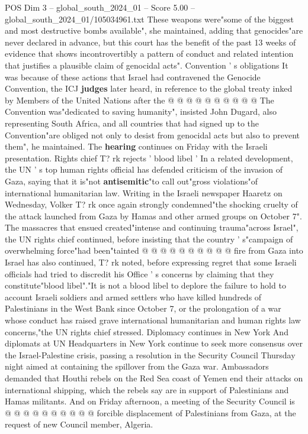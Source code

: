 \begin{textsample}{POS Dim 3 – global\_south\_2024\_01 – Score 5.00 – global\_south\_2024\_01/105034961.txt}
These weapons were"some of the biggest and most destructive bombs available", she maintained, adding that genocides"are never declared in advance, but this court has the benefit of the past 13 weeks of evidence that shows incontrovertibly a pattern of conduct and related intention that justifies a plausible claim of genocidal acts".
Convention ' s obligations It was because of these actions that Israel had contravened the Genocide Convention, the ICJ \textbf{judges} later heard, in reference to the global treaty inked by Members of the United Nations after the @ @ @ @ @ @ @ @ @ @ The Convention was"dedicated to saving humanity", insisted John Dugard, also representing South Africa, and all countries that had signed up to the Convention"are obliged not only to desist from genocidal acts but also to prevent them", he maintained.
The \textbf{hearing} continues on Friday with the Israeli presentation.
Rights chief T? rk rejects ' blood libel ' In a related development, the UN ' s top human rights official has defended criticism of the invasion of Gaza, saying that it is"not \textbf{antisemitic}"to call out"gross violations"of international humanitarian law.
Writing in the Israeli newspaper Haaretz on Wednesday, Volker T? rk once again strongly condemned"the shocking cruelty of the attack launched from Gaza by Hamas and other armed groups on October 7".
The massacres that ensued created"intense and continuing trauma"across Israel", the UN rights chief continued, before insisting that the country ' s"campaign of overwhelming force"had been"tainted @ @ @ @ @ @ @ @ @ @ fire from Gaza into Israel has also continued, T? rk noted, before expressing regret that some Israeli officials had tried to discredit his Office ' s concerns by claiming that they constitute"blood libel"."It is not a blood libel to deplore the failure to hold to account Israeli soldiers and armed settlers who have killed hundreds of Palestinians in the West Bank since October 7, or the prolongation of a war whose conduct has raised grave international humanitarian and human rights law concerns,"the UN rights chief stressed.
Diplomacy continues in New York And diplomats at UN Headquarters in New York continue to seek more consensus over the Israel-Palestine crisis, passing a resolution in the Security Council Thursday night aimed at containing the spillover from the Gaza war.
Ambassadors demanded that Houthi rebels on the Red Sea coast of Yemen end their attacks on international shipping, which the rebels say are in support of Palestinians and Hamas militants.
And on Friday afternoon, a meeting of the Security Council is @ @ @ @ @ @ @ @ @ @ forcible displacement of Palestinians from Gaza, at the request of new Council member, Algeria.

\end{textsample}
